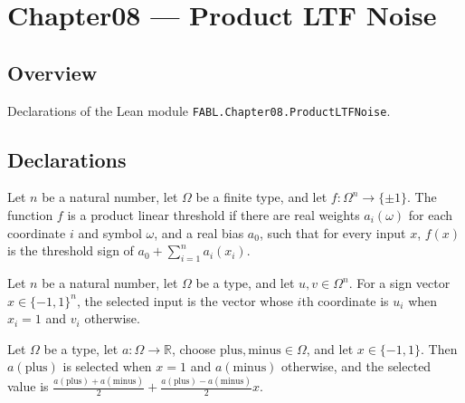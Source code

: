 \chapter{Chapter08 — Product LTF Noise}
\section{Overview}

Declarations of the Lean module \texttt{FABL.Chapter08.ProductLTFNoise}.

\section{Declarations}

\begin{definition}
\label{FABL.IsProductLinearThreshold}
\leanok
{}
Let $n$ be a natural number, let $\Omega$ be a finite type, and let
$f:\Omega^n\to\{\pm1\}$. The function $f$ is a product linear threshold if there are
real weights $a_{i}(\omega)$ for each coordinate $i$ and symbol $\omega$, and a real
bias $a_0$, such that for every input $x$, $f(x)$ is the threshold sign of
$a_0+\sum_{i=1}^n a_i(x_i)$.
\end{definition}

\begin{definition}
\label{FABL.selectProductInput}
\leanok
Let $n$ be a natural number, let $\Omega$ be a type, and let $u,v\in\Omega^n$. For a
sign vector $x\in\{-1,1\}^n$, the selected input is the vector whose $i$th coordinate is
$u_i$ when $x_i=1$ and $v_i$ otherwise.
\end{definition}

\begin{theorem}
\label{FABL.selectedScore_eq_midpoint_add_difference}
\leanok
{}
Let $\Omega$ be a type, let $a:\Omega\to\mathbb{R}$, choose
$\text{plus},\text{minus}\in\Omega$, and let $x\in\{−1,1\}$. Then $a(\text{plus})$ is
selected when $x=1$ and $a(\text{minus})$ otherwise, and the selected value is
$\frac{a(\text{plus})+a(\text{minus})}{2}+\frac{a(\text{plus})-a(\text{minus})}{2}x$.
\end{theorem}

